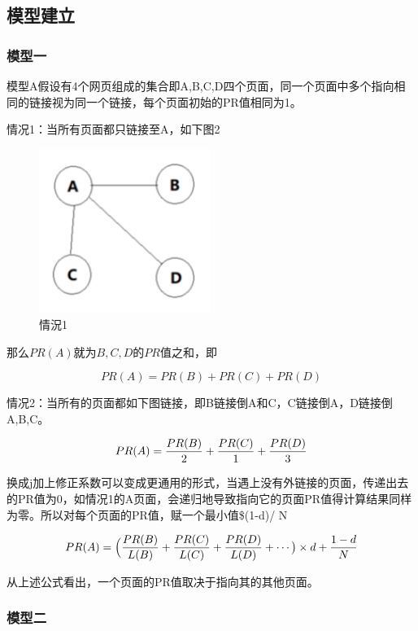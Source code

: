 \documentclass[UTF8
]{ctexart}
\begin{document}
\hypertarget{header-n46}{%
\subsection{模型建立}\label{header-n46}}

\hypertarget{header-n47}{%
\subsubsection{模型一}\label{header-n47}}

模型A假设有4个网页组成的集合即A,B,C,D四个页面，同一个页面中多个指向相同的链接视为同一个链接，每个页面初始的PR值相同为1。

情况1：当所有页面都只链接至A，如下图2
\begin{figure}[htbp]
	\centering
	\includegraphics[width=2.2in]{1_2.png}
	\caption{情況1}
	\label{img2}
\end{figure}

那么\(PR(A)\)就为\(B,C,D\)的\(PR\)值之和，即

\[PR(A)=PR(B)+PR(C)+PR(D)\]

情况2：当所有的页面都如下图链接，即B链接倒A和C，C链接倒A，D链接倒A,B,C。

\[PR(A)= {PR(B)\over 2}+{PR(C)\over 1}+{PR(D)\over 3}\]

换成j加上修正系数可以变成更通用的形式，当遇上没有外链接的页面，传递出去的PR值为0，如情况1的A页面，会递归地导致指向它的页面PR值得计算结果同样为零。所以对每个页面的PR值，赋一个最小值\$(1-d)/
N

\[PR(A)=  \Bigl({PR(B)\over L(B)}+{PR(C)\over L(C)}+{PR(D)\over L(D)}+\cdots\bigr)\times d+{1-d\over N}\]

从上述公式看出，一个页面的PR值取决于指向其的其他页面。

\hypertarget{header-n57}{%
\subsubsection{模型二}\label{header-n57}}
\end{document}
